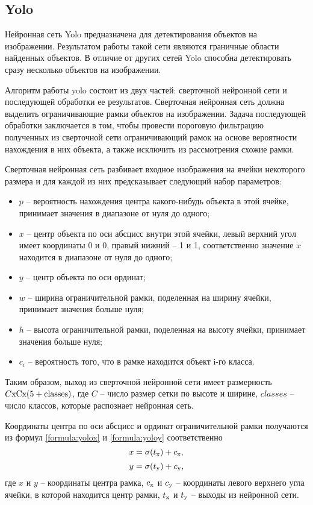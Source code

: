 \subsection{Yolo}
Нейронная сеть Yolo предназначена для детектирования объектов на изображении. Результатом работы такой сети являются граничные области найденных объектов. В отличие от других сетей Yolo способна детектировать сразу несколько объектов на изображении.

Алгоритм работы yolo состоит из двух частей: сверточной нейронной сети и последующей обработки ее результатов. Сверточная нейронная сеть должна выделить ограничивающие рамки объектов на изображении. Задача последующей обработки заключается в том, чтобы провести пороговую фильтрацию полученных из сверточной сети ограничивающий рамок на основе вероятности нахождения в них объекта, а также исключить из рассмотрения схожие рамки.

Сверточная нейронная сеть разбивает входное изображения на ячейки некоторого размера и для каждой из них предсказывает следующий набор параметров:
\begin{itemize}
	\item $p$ -- вероятность нахождения центра какого-нибудь объекта в этой ячейке, принимает значения в диапазоне от нуля до одного;
	\item $x$ -- центр объекта по оси абсцисс внутри этой ячейки, левый верхний угол имеет координаты 0 и 0, правый нижний -- 1 и 1, соответственно значение $x$ находится в диапазоне от нуля до одного;
	\item $y$ -- центр объекта по оси ординат;
	\item $w$ -- ширина ограничительной рамки, поделенная на ширину ячейки, принимает значения больше нуля;
	\item $h$ -- высота ограничительной рамки, поделенная на высоту ячейки, принимает значения больше нуля;
	\item $c_i$ -- вероятность того, что в рамке находится объект i-го класса.
\end{itemize}

Таким образом, выход из сверточной нейронной сети имеет размерность $C\rm{x}C\rm{x}(5+classes)$, где $C$ -- число размер сетки по высоте и ширине, $classes$ -- число классов, которые распознает нейронная сеть.

Координаты центра по оси абсцисс и ординат ограничительной рамки получаются из формул \ref{formula:yolox} и \ref{formula:yoloy} соответственно
\begin{equation}\label{formula:yolox}
x = \sigma(t_{\rm{x}}) + c_{\rm{x}},
\end{equation}
\begin{equation}\label{formula:yoloy}
y = \sigma(t_{\rm{y}}) + c_{\rm{y}},
\end{equation}
где $x$ и $y$ -- координаты центра рамка, $c_{\rm{x}}$ и $c_{\rm{y}}$ -- координаты левого верхнего угла ячейки, в которой находится центр рамки, $t_{\rm{x}}$ и $t_{\rm{y}}$ -- выходы из нейронной сети.

